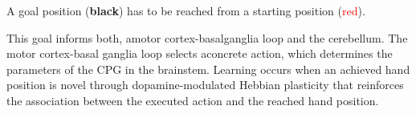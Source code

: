 \documentclass[portrait,final,a0paper,fontscale=0.33]{baposter}
\begin{document}
\begin{poster}
{\begin{adjustbox}{minipage=0.95\textwidth, margin=5pt, center}
		\begin{minipage}[b]{0.35\textwidth}
			A goal position (\textbf{black}) has to be reached from a starting position (\textcolor{red}{red}). 
		\end{minipage}
		\begin{minipage}[b]{0.65\textwidth}
	This goal informs both, amotor cortex-basalganglia loop and the cerebellum. The motor cortex-basal ganglia loop selects aconcrete action, which determines the parameters of the CPG in the brainstem. Learning occurs when an achieved hand position is novel through dopamine-modulated Hebbian plasticity that reinforces the association between the executed action and the reached hand position.
		\end{minipage}
	
	\end{adjustbox}

	

}


\end{poster}
\end{document}
